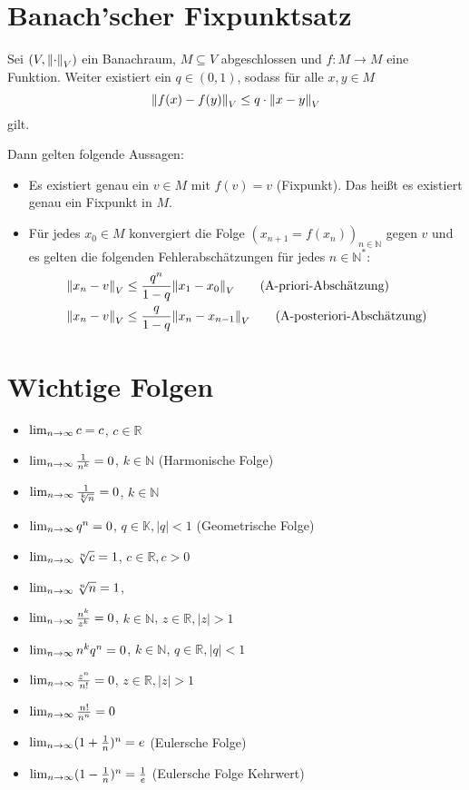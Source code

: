 	\section{Banach'scher Fixpunktsatz}
		Sei $ (V, \norm{\cdot} _ V) $ ein Banachraum, $ M \subseteq V $ abgeschlossen und $ f : M \rightarrow M $ eine Funktion. Weiter existiert ein $ q \in (0, 1) $, sodass für alle $ x, y \in M $ \[ \norm{f(x) - f(y)} _ V \leq q \cdot \norm{x - y} _ V \] gilt.

		Dann gelten folgende Aussagen:
		\begin{itemize}
			\item Es existiert genau ein $ v \in M $ mit $ f(v) = v $ (Fixpunkt). Das heißt es existiert genau ein Fixpunkt in $ M $.
			\item Für jedes $ x _ 0 \in M $ konvergiert die Folge $ (x _ { n + 1 } = f(x _ n)) _ { n \in \mathbb{N} } $ gegen $ v $ und es gelten die folgenden Fehlerabschätzungen für jedes $ n \in \mathbb{N} ^ * $:
				\begin{align*}
					\norm{x _ n - v} _ V & \leq \frac{q ^ n}{1 - q} \norm{x _ 1 - x _ 0} _ V \tag{A-priori-Abschätzung}         \\
					\norm{x _ n - v} _ V & \leq \frac{q}{1 - q} \norm{x _ n - x _ { n - 1 }} _ V \tag{A-posteriori-Abschätzung} \\
				\end{align*}
		\end{itemize}

	\section{Wichtige Folgen}
		\begin{itemize}
			\item $ \lim_{n \to \infty} c = c $, $ c \in \mathbb{R} $
			\item $ \lim_{n \to \infty} \frac{1}{n ^ k} = 0 $, $ k \in \mathbb{N} $ (Harmonische Folge)
			\item $ \lim_{n \to \infty} \frac{1}{\sqrt[k]{n}} = 0 $, $ k \in \mathbb{N} $
			\item $ \lim_{n \to \infty} q ^ n = 0 $, $ q \in \mathbb{K}, \lvert q \rvert < 1 $ (Geometrische Folge)
			\item $ \lim_{n \to \infty} \sqrt[n]{c} = 1 $, $ c \in \mathbb{R}, c > 0 $
			\item $ \lim_{n \to \infty} \sqrt[n]{n} = 1 $,
			\item $ \lim_{n \to \infty} \frac{n ^ k}{z ^ k} = 0 $, $ k \in \mathbb{N} $, $ z \in \mathbb{R}, \lvert z \rvert > 1 $
			\item $ \lim_{n \to \infty} n ^ k q ^ n = 0 $, $ k \in \mathbb{N} $, $ q \in \mathbb{R}, \lvert q \rvert < 1 $
			\item $ \lim_{n \to \infty} \frac{z ^ n}{n!} = 0 $, $ z \in \mathbb{R}, \lvert z \rvert > 1 $
			\item $ \lim_{n \to \infty} \frac{n!}{n ^ n} = 0 $
			\item $ \lim_{n \to \infty} (1 + \frac{1}{n}) ^ n = e $ (Eulersche Folge)
			\item $ \lim_{n \to \infty} (1 - \frac{1}{n}) ^ n = \frac{1}{e} $ (Eulersche Folge Kehrwert)
		\end{itemize}

